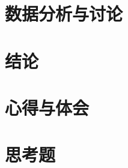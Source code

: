 \documentclass[10.5pt]{config}
\begin{document}
\section{数据分析与讨论}

\section{结论}

\section{心得与体会}

\section{思考题}
\end{document}
